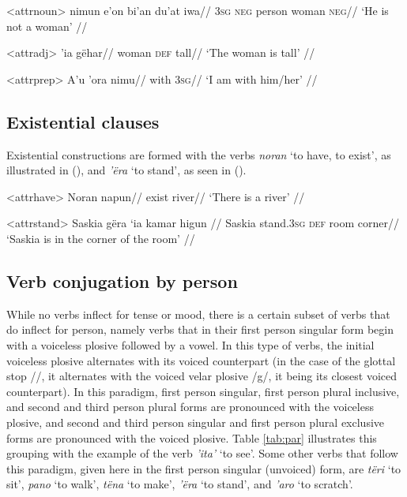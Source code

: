 \documentclass[12pt]{article}
\begin{document}
\ex<attrnoun>
\begingl %
\gla nimun e'on bi'an du'at iwa//
\glb \textsc{3sg} \textsc{neg} person woman \textsc{neg}//
\glft `He is not a woman' // 
\endgl
\xe 

\ex<attradj>
\begingl %
 'ia gëhar//
\glb woman \textsc{def} tall//
\glft `The woman is tall' // 
\endgl
\xe 

\ex<attrprep>
\begingl %
\gla A'u 'ora nimu//
\glb {\First{}\Sg{}} with \textsc{3sg}//
\glft `I am with him/her' // 
\endgl
\xe 

\subsection{Existential clauses}
Existential constructions are formed with the verbs \textit{noran} `to have, to exist', as illustrated in (), and \textit{'ëra} `to stand', as seen in ().

\ex<attrhave>
\begingl %
\gla Noran napun//
\glb exist river//
\glft `There is a river' // 
\endgl
\xe 

\ex<attrstand>
\begingl %
\gla Saskia gëra ‘ia kamar higun //
\glb Saskia stand.\textsc{3sg} \textsc{def} room corner//
\glft `Saskia is in the corner of the room' // 
\endgl
\xe 

\subsection{Verb conjugation by person}\label{sec:conj}

While no verbs inflect for tense or mood, there is a certain subset of verbs that do inflect for person, namely verbs that in their first person singular form begin with a voiceless plosive followed by a vowel. In this type of verbs, the initial voiceless plosive alternates with its voiced counterpart (in the case of the glottal stop /\textglotstop/, it alternates with the voiced velar plosive /g/, it being its closest voiced counterpart). In this paradigm, first person singular, first person plural inclusive, and second and third person plural forms are pronounced with the voiceless plosive, and second and third person singular and first person plural exclusive forms are pronounced with the voiced plosive. Table \ref{tab:par} illustrates this grouping with the example of the verb \textit{'ita'} `to see'. Some other verbs that follow this paradigm, given here in the first person singular (unvoiced) form, are \textit{tëri} `to sit', \textit{pano} `to walk', \textit{tëna} `to make', \textit{'ëra} `to stand', and \textit{'aro} `to scratch'.
\end{document}
